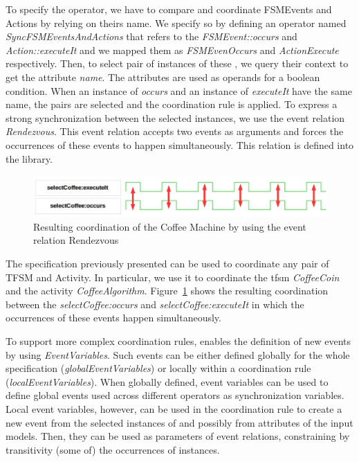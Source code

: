 To specify the operator, we have to compare and coordinate FSMEvents and Actions by relying on theirs name. We specify so by defining an operator named \emph{SyncFSMEventsAndActions} that refers to the \dse \emph{FSMEvent::occurs} and \emph{Action::executeIt} and we mapped them as \emph{FSMEvenOccurs} and \emph{ActionExecute} respectively. Then, to select pair of instances of these \dse, we query their context to get the attribute \emph{name}. The attributes are used as operands for a boolean condition. When an instance of \dse \emph{occurs} and an instance of \dse \emph{executeIt} have the same name, the pairs are selected and the coordination rule is applied. To express a strong synchronization between the selected instances, we use the event relation
\emph{Rendezvous}. This event relation accepts two events as arguments and forces the occurrences of these events to happen simultaneously. This relation is defined into the library.  

\begin{figure}[h]
	\center
	\includegraphics[width=.8\textwidth]{bcool/figs/runningrdv}
	\caption{Resulting coordination of the Coffee Machine by using the event relation Rendezvous}
	\label{fig:runningrdv}
\end{figure}

The specification previously presented can be used to coordinate any pair of TFSM and Activity. In particular, we use it to coordinate the tfsm \emph{CoffeeCoin} and the activity \emph{CoffeeAlgorithm}. Figure~\ref{fig:runningrdv} shows the resulting coordination between the \mse \emph{selectCoffee:occurs} and \emph{selectCoffee:executeIt} in which the occurrences of these events happen simultaneously.  

To support more complex coordination rules, \bcool enables the definition of new events by using \emph{EventVariables}. Such events can be either defined globally for the whole specification (\emph{globalEventVariables}) or locally within a coordination rule (\emph{localEventVariables}). When globally defined, event variables can be used to define global events used across different operators as synchronization variables. Local event variables, however, can be used in the coordination rule to create a new event from the selected instances of \dse and possibly from attributes of the input models. Then, they can be used as parameters of event relations, constraining by transitivity (some of) the occurrences of \dse instances. 

